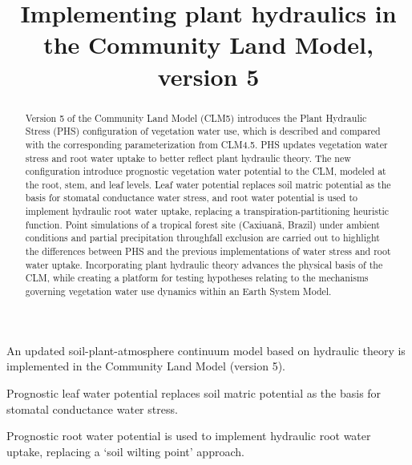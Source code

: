 \documentclass[draft,linenumbers]{agujournal}
\begin{document}
\title{Implementing plant hydraulics in the Community Land Model, version 5}



\begin{keypoints}
\item An updated soil-plant-atmosphere continuum model based on hydraulic theory is implemented in the Community Land Model (version 5).
\item Prognostic leaf water potential replaces soil matric potential as the basis for stomatal conductance water stress. 
\item Prognostic root water potential is used to implement hydraulic root water uptake, replacing a `soil wilting point' approach.
\end{keypoints}



\begin{abstract}
Version 5 of the Community Land Model (CLM5) introduces the Plant Hydraulic Stress (PHS) configuration of vegetation water use, which is described and compared with the corresponding parameterization from CLM4.5.
PHS updates vegetation water stress and root water uptake to better reflect plant hydraulic theory.
The new configuration introduce prognostic vegetation water potential to the CLM, modeled at the root, stem, and leaf levels.
Leaf water potential replaces soil matric potential as the basis for stomatal conductance water stress, and
root water potential is used to implement hydraulic root water uptake, replacing a transpiration-partitioning heuristic function.
Point simulations of a tropical forest site (Caxiuan\~a, Brazil) under ambient conditions and partial precipitation throughfall exclusion are carried out to highlight the differences between PHS and the previous implementations of water stress and root water uptake.
Incorporating plant hydraulic theory advances the physical basis of the CLM, while creating a platform for testing hypotheses relating to the mechanisms governing vegetation water use dynamics within an Earth System Model.
\end{abstract}
\end{document}
